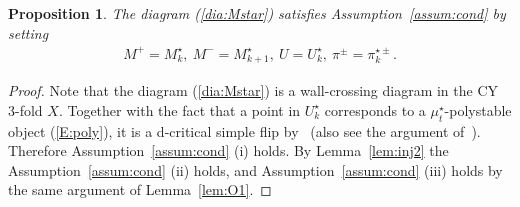 \documentclass[11pt]{amsart}
\theoremstyle{plain}
\newtheorem{prop}[thm]{Proposition}
\begin{document}
\begin{prop}\label{prop:MU}
The diagram (\ref{dia:Mstar})
satisfies
Assumption~\ref{assum:cond}
by setting 
\begin{align*}
M^+=M_k^{\star}, \ M^-=M_{k+1}^{\star}, \ 
U=U_k^{\star}, \ 
\pi^{\pm}=\pi_k^{\star\pm}.
\end{align*}
\end{prop}
\begin{proof}
Note that the diagram (\ref{dia:Mstar}) is a wall-crossing diagram 
in the CY 3-fold $X$.
Together with the fact that 
a point in $U_k^{\star}$ corresponds to a $\mu_t^{\star}$-polystable 
object (\ref{E:poly}), it is a
d-critical simple flip by~\cite[Example~6.3]{Toddbir}
(also see the argument of~\cite[Theorem~9.22]{Toddbir}). 
Therefore Assumption~\ref{assum:cond} (i) holds. 
By Lemma~\ref{lem:inj2}
the Assumption~\ref{assum:cond} (ii) holds, 
and Assumption~\ref{assum:cond} (iii) 
holds by the same argument of Lemma~\ref{lem:O1}. 
\end{proof}
\end{document}

